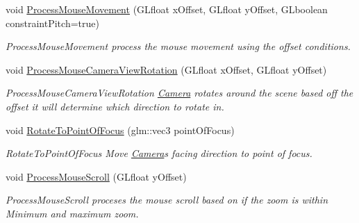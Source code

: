 \begin{DoxyCompactItemize}
void \hyperlink{class_camera_ad74e2911d43fe9f34f42499b5180a362}{Process\+Mouse\+Movement} (G\+Lfloat x\+Offset, G\+Lfloat y\+Offset, G\+Lboolean constraint\+Pitch=true)
\begin{DoxyCompactList}\small\item\em Process\+Mouse\+Movement process the mouse movement using the offset conditions. \end{DoxyCompactList}\item 
void \hyperlink{class_camera_a58246ec7f4f0852005e09c8ab8f54642}{Process\+Mouse\+Camera\+View\+Rotation} (G\+Lfloat x\+Offset, G\+Lfloat y\+Offset)
\begin{DoxyCompactList}\small\item\em Process\+Mouse\+Camera\+View\+Rotation \hyperlink{class_camera}{Camera} rotates around the scene based off the offset it will determine which direction to rotate in. \end{DoxyCompactList}\item 
void \hyperlink{class_camera_aa8bb7760c16698825004048c4c033ada}{Rotate\+To\+Point\+Of\+Focus} (glm\+::vec3 point\+Of\+Focus)
\begin{DoxyCompactList}\small\item\em Rotate\+To\+Point\+Of\+Focus Move \hyperlink{class_camera}{Camera}\textquotesingle{}s facing direction to point of focus. \end{DoxyCompactList}\item 
void \hyperlink{class_camera_a70b8364d53d5851210baacf35b7bd837}{Process\+Mouse\+Scroll} (G\+Lfloat y\+Offset)
\begin{DoxyCompactList}\small\item\em Process\+Mouse\+Scroll proceses the mouse scroll based on if the zoom is within Minimum and maximum zoom. \end{DoxyCompactList}\end{DoxyCompactItemize}
